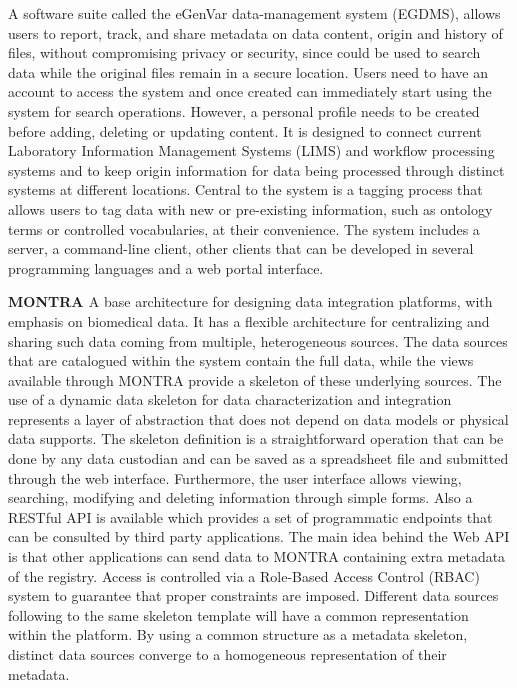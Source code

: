 A software suite called the eGenVar data-management system (EGDMS), allows users to
report, track, and share metadata on data content, origin and history of files, without
compromising privacy or security, since could be used to search data while the original
files remain in a secure location.
Users need to have an account to access the system and once created can immediately
start using the system for search operations. However, a personal profile needs to be
created before adding, deleting or updating content.
It is designed to connect current Laboratory Information Management Systems (LIMS) and
workflow processing systems and to keep origin information for data being processed
through distinct systems at different locations.
Central to the system is a tagging process that allows users to tag data with new or
pre-existing information, such as ontology terms or controlled vocabularies, at their
convenience.
The system includes a server, a command-line client, other clients that can be
developed in several programming languages and a web portal interface.


\textbf{MONTRA \cite{montra}}
A base architecture for designing data integration platforms, with emphasis on
biomedical data. It has a flexible architecture for centralizing and sharing such data
coming from multiple, heterogeneous sources. The data sources that are catalogued
within the system contain the full data, while the views available through MONTRA
provide a skeleton of these underlying sources. The use of a dynamic data skeleton for
data characterization and integration represents a layer of abstraction that does not
depend on data models or physical data supports. The skeleton definition is a
straightforward operation that can be done by any data custodian and can be saved as a
spreadsheet file and submitted through the web interface. Furthermore, the user
interface allows viewing, searching, modifying and deleting information through simple
forms. Also a RESTful API is available which provides a set of programmatic endpoints
that can be consulted by third party applications. The main idea behind the Web API is
that other applications can send data to MONTRA containing extra metadata of the
registry. Access is controlled via a Role-Based Access Control (RBAC) system to
guarantee that proper constraints are imposed. Different data sources following to the
same skeleton template will have a common representation within the platform. By using
a common structure as a metadata skeleton, distinct data sources converge to a
homogeneous representation of their metadata.

